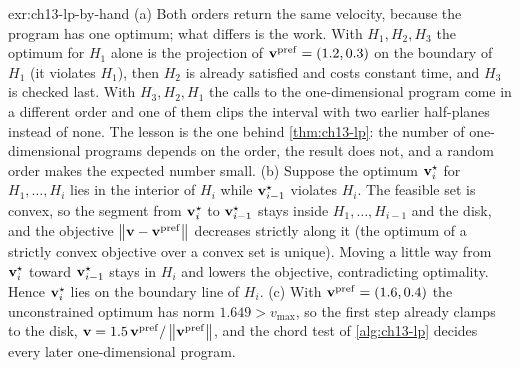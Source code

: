 \begin{solution}{exr:ch13-lp-by-hand}
(a) Both orders return the same velocity, because the program has one optimum; what differs is the work. With $H_1, H_2, H_3$ the optimum for $H_1$ alone is the projection of $\mathbf{v}^{\mathrm{pref}} = (1.2, 0.3)$ on the boundary of $H_1$ (it violates $H_1$), then $H_2$ is already satisfied and costs constant time, and $H_3$ is checked last. With $H_3, H_2, H_1$ the calls to the one-dimensional program come in a different order and one of them clips the interval with two earlier half-planes instead of none. The lesson is the one behind \cref{thm:ch13-lp}: the number of one-dimensional programs depends on the order, the result does not, and a random order makes the expected number small.
(b) Suppose the optimum $\mathbf{v}^{\star}_{i}$ for $H_1, \dots, H_i$ lies in the interior of $H_i$ while $\mathbf{v}^{\star}_{i-1}$ violates $H_i$. The feasible set is convex, so the segment from $\mathbf{v}^{\star}_{i}$ to $\mathbf{v}^{\star}_{i-1}$ stays inside $H_1, \dots, H_{i-1}$ and the disk, and the objective $\left\lVert \mathbf{v} - \mathbf{v}^{\mathrm{pref}} \right\rVert$ decreases strictly along it (the optimum of a strictly convex objective over a convex set is unique). Moving a little way from $\mathbf{v}^{\star}_{i}$ toward $\mathbf{v}^{\star}_{i-1}$ stays in $H_i$ and lowers the objective, contradicting optimality. Hence $\mathbf{v}^{\star}_{i}$ lies on the boundary line of $H_i$.
(c) With $\mathbf{v}^{\mathrm{pref}} = (1.6, 0.4)$ the unconstrained optimum has norm $1.649 > v_{\max}$, so the first step already clamps to the disk, $\mathbf{v} = 1.5\,\mathbf{v}^{\mathrm{pref}}/\left\lVert \mathbf{v}^{\mathrm{pref}} \right\rVert$, and the chord test of \cref{alg:ch13-lp} decides every later one-dimensional program.
\end{solution}

